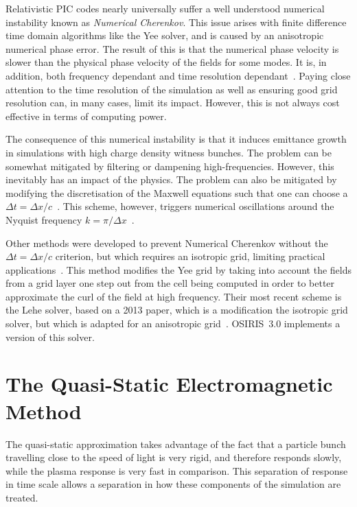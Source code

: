 Relativistic PIC codes nearly universally suffer a well understood numerical instability known as \textit{Numerical Cherenkov}.
This issue arises with finite difference time domain algorithms like the Yee solver, and is caused by an anisotropic numerical phase error.
The result of this is that the numerical phase velocity is slower than the physical phase velocity of the fields for some modes.
It is, in addition, both frequency dependant and time resolution dependant~\cite{godfrey:1974,greenwood:2004}.
Paying close attention to the time resolution of the simulation as well as ensuring good grid resolution can, in many cases, limit its impact.
However, this is not always cost effective in terms of computing power.

The consequence of this numerical instability is that it induces emittance growth in simulations with high charge density witness bunches.
The problem can be somewhat mitigated by filtering or dampening high-frequencies.
However, this inevitably has an impact of the physics.
The problem can also be mitigated by modifying the discretisation of the Maxwell equations such that one can choose a $\Delta t = \Delta x/c$~\cite{pukhov:1999}.
This scheme, however, triggers numerical oscillations around the Nyquist frequency $k = \pi/\Delta x$~\cite{vay:2011a}.

Other methods were developed to prevent Numerical Cherenkov without the $\Delta t = \Delta x/c$ criterion, but which requires an isotropic grid, limiting practical applications~\cite{greenwood:2004}.
This method modifies the Yee grid by taking into account the fields from a grid layer one step out from the cell being computed in order to better approximate the curl of the field at high frequency.
Their most recent scheme is the Lehe solver, based on a 2013 paper, which is a modification the isotropic grid solver, but which is adapted for an anisotropic grid~\cite{lehe:2013}.
OSIRIS~3.0 implements a version of this solver.

\section{The Quasi-Static Electromagnetic Method}
\label{PIC:QS}

The quasi-static approximation takes advantage of the fact that a particle bunch travelling close to the speed of light is very rigid, and therefore responds slowly, while the plasma response is very fast in comparison.
This separation of response in time scale allows a separation in how these components of the simulation are treated.

